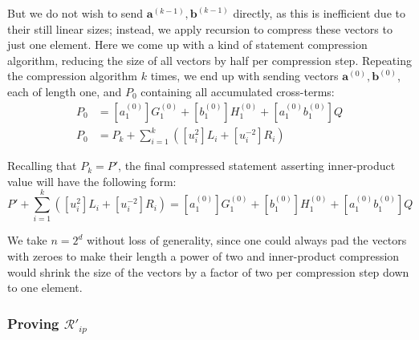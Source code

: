 \documentclass[../../book.tex]{subfiles}
\begin{document}
But we do not wish to send $\mathbf{a}^{(k-1)}, \mathbf{b}^{(k-1)}$ directly, as this is inefficient due to their still linear sizes; instead, we apply recursion to compress these vectors to just one element. Here we come up with a kind of statement compression algorithm, reducing the size of all vectors by half per compression step. Repeating the compression algorithm $k$ times, we end up with sending vectors $\mathbf{a}^{(0)}, \mathbf{b}^{(0)}$, each of length one, and $P_0$ containing all accumulated cross-terms:
\begin{align*}
    P_0 &= [a_1^{(0)}]G_1^{(0)} + [b_1^{(0)}]H_1^{(0)} + [a_1^{(0)}b_1^{(0)}]Q \\
    P_0 &= P_k + \sum_{i=1}^k ([u_i^2]L_i + [u_i^{-2}]R_i)
\end{align*}

Recalling that $P_k = P'$, the final compressed statement asserting inner-product value will have the following form:
\begin{equation}
    P' + \sum_{i=1}^k ([u_i^2]L_i + [u_i^{-2}]R_i) = [a_1^{(0)}]G_1^{(0)} + [b_1^{(0)}]H_1^{(0)} + [a_1^{(0)}b_1^{(0)}]Q
    \label{eq:ip-final-compressed}
\end{equation}

\begin{remark}
    We take $n=2^d$ without loss of generality, since one could always pad the vectors with zeroes to make their length a power of two and inner-product compression would shrink the size of the vectors by a factor of two per compression step down to one element.
\end{remark}

\subsubsection{Proving $\mathcal{R}'_{ip}$}
\end{document}
